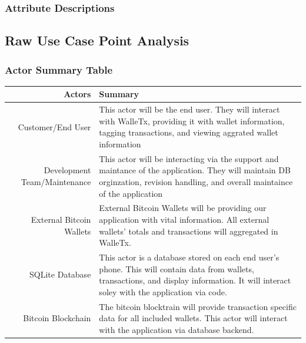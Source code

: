     \subsubsection{Attribute Descriptions}
  \subsection{Raw Use Case Point Analysis}
    \subsubsection{Actor Summary Table}
    \begin{table}[H]
      \begin{tabularx}{\textwidth}{r | X}
        Actors                       & Summary\\
        \hline
        Customer/End User            & This actor will be the end user.  They will interact with WalleTx,  providing it with wallet information, tagging transactions, and viewing  aggrated wallet information\\
        Development Team/Maintenance & This actor will be interacting via the support and maintance of the  application.  They will maintain DB orginzation, revision handling, and  overall maintaince of the application\\
        External Bitcoin Wallets     & External Bitcoin Wallets will be providing our application with vital  information.  All external wallets' totals and transactions will  aggregated in WalleTx.\\
        SQLite Database              & This actor is a database stored on each end user's phone. This will  contain data from wallets, transactions, and display information.  It  will interact soley with the application via code.\\
        Bitcoin Blockchain           & The bitcoin blocktrain will provide transaction specific data for all  included wallets. This actor will interact with the application via  database backend.\\
      \end{tabularx}
    \end{table}

